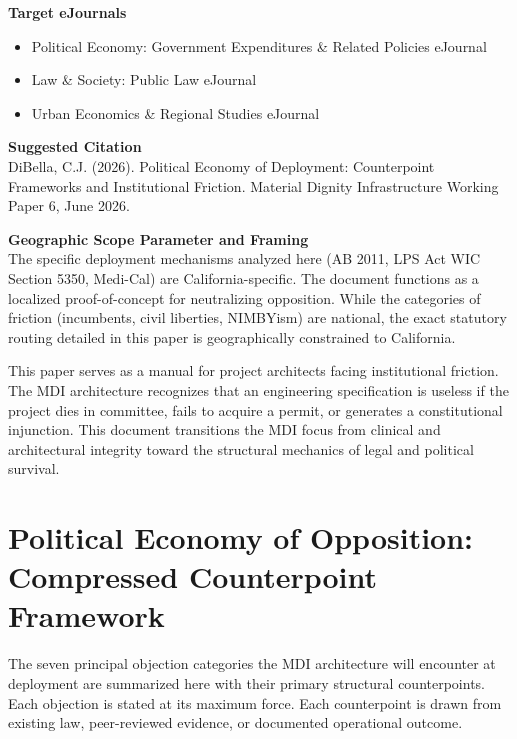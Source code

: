 \documentclass[12pt, letterpaper]{article}
\begin{document}
\vspace{8pt}
\noindent\textbf{Target eJournals}
\begin{itemize}[nosep, before={\vspace{-8pt}}, leftmargin=2em]
    \item Political Economy: Government Expenditures \& Related Policies eJournal
    \item Law \& Society: Public Law eJournal
    \item Urban Economics \& Regional Studies eJournal
\end{itemize}

\vspace{8pt}
\noindent\textbf{Suggested Citation}\\[1pt]
DiBella, C.J. (2026). Political Economy of Deployment: Counterpoint Frameworks and Institutional Friction. Material Dignity Infrastructure Working Paper 6, June 2026.

\newpage

\vspace{8pt}
\noindent\textbf{Geographic Scope Parameter and Framing}\\[1pt]
The specific deployment mechanisms analyzed here (AB 2011, LPS Act WIC Section 5350, Medi-Cal) are California-specific. The document functions as a localized proof-of-concept for neutralizing opposition. While the categories of friction (incumbents, civil liberties, NIMBYism) are national, the exact statutory routing detailed in this paper is geographically constrained to California.

This paper serves as a manual for project architects facing institutional friction. The MDI architecture recognizes that an engineering specification is useless if the project dies in committee, fails to acquire a permit, or generates a constitutional injunction. This document transitions the MDI focus from clinical and architectural integrity toward the structural mechanics of legal and political survival.

\newpage
\begingroup
{}
\setlength{\cftbeforesecskip}{2pt}
\setlength{\cftbeforesubsecskip}{-2pt}
\tableofcontents
\endgroup

\clearpage
{}

\section{Political Economy of Opposition: Compressed Counterpoint Framework}

The seven principal objection categories the MDI architecture will encounter at deployment are summarized here with their primary structural counterpoints. Each objection is stated at its maximum force. Each counterpoint is drawn from existing law, peer-reviewed evidence, or documented operational outcome.
\end{document}
